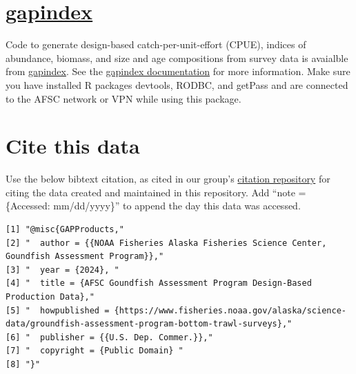 \documentclass[
  letterpaper,
  oneside,
  open=any]{scrbook}
\begin{document}
\section*{\texorpdfstring{\href{https://github.com/afsc-gap-products/gapindex}{gapindex}}{gapindex}}\label{gapindex}


Code to generate design-based catch-per-unit-effort (CPUE), indices of
abundance, biomass, and size and age compositions from survey data is
avaialble from
\href{https://github.com/afsc-gap-products/gapindex}{gapindex}. See the
\href{https://afsc-gap-products.github.io/gapindex/}{gapindex
documentation} for more information. Make sure you have installed R
packages devtools, RODBC, and getPass and are connected to the AFSC
network or VPN while using this package.

\section*{Cite this data}\label{cite-this-data-1}


Use the below bibtext citation, as cited in our group's
\href{https://github.com/afsc-gap-products/citations/blob/main/cite/bibliography.bib}{citation
repository} for citing the data created and maintained in this
repository. Add ``note = \{Accessed: mm/dd/yyyy\}'' to append the day
this data was accessed.

\begin{verbatim}
[1] "@misc{GAPProducts,"                                                                                                       
[2] "  author = {{NOAA Fisheries Alaska Fisheries Science Center, Goundfish Assessment Program}},"                             
[3] "  year = {2024}, "                                                                                                        
[4] "  title = {AFSC Goundfish Assessment Program Design-Based Production Data},"                                              
[5] "  howpublished = {https://www.fisheries.noaa.gov/alaska/science-data/groundfish-assessment-program-bottom-trawl-surveys},"
[6] "  publisher = {{U.S. Dep. Commer.}},"                                                                                     
[7] "  copyright = {Public Domain} "                                                                                           
[8] "}"                                                                                                                        
\end{verbatim}
\end{document}
